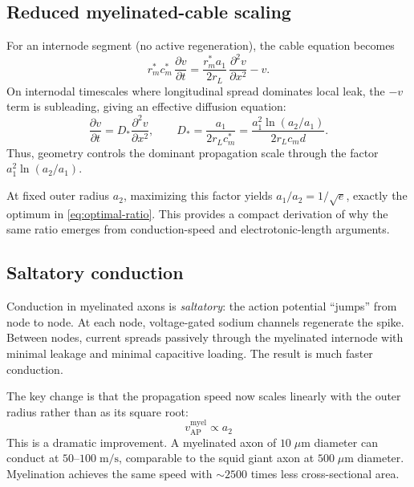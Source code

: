 \subsection{Reduced myelinated-cable scaling}

For an internode segment (no active regeneration), the cable equation becomes
%
\begin{equation}
  r_m^* c_m^*\,\frac{\partial v}{\partial t}
  =
  \frac{r_m^* a_1}{2r_L}\,\frac{\partial^2 v}{\partial x^2}
  - v.
  \label{eq:myelin-cable}
\end{equation}
%
On internodal timescales where longitudinal spread dominates local leak, the $-v$ term is subleading, giving an effective diffusion equation:
%
\begin{equation}
  \frac{\partial v}{\partial t} = D_* \frac{\partial^2 v}{\partial x^2},
  \qquad
  D_*=\frac{a_1}{2r_L c_m^*}
  =\frac{a_1^2\ln(a_2/a_1)}{2r_L c_m d}.
  \label{eq:myelin-diffusion}
\end{equation}
%
Thus, geometry controls the dominant propagation scale through the factor
$a_1^2\ln(a_2/a_1)$.

At fixed outer radius $a_2$, maximizing this factor yields
$a_1/a_2=1/\sqrt{e}$, exactly the optimum in \cref{eq:optimal-ratio}. This provides a compact derivation of why the same ratio emerges from conduction-speed and electrotonic-length arguments.

\subsection{Saltatory conduction}

Conduction in myelinated axons is \emph{saltatory}: the action potential ``jumps'' from node to node. At each node, voltage-gated sodium channels regenerate the spike. Between nodes, current spreads passively through the myelinated internode with minimal leakage and minimal capacitive loading. The result is much faster conduction.

The key change is that the propagation speed now scales linearly with the outer radius rather than as its square root:
%
\begin{equation}
  v_{\text{AP}}^{\text{myel}} \propto a_2
  \label{eq:myelin-speed}
\end{equation}
%
This is a dramatic improvement. A myelinated axon of $10\;\mu\text{m}$ diameter can conduct at $50$--$100\;\text{m/s}$, comparable to the squid giant axon at $500\;\mu\text{m}$ diameter. Myelination achieves the same speed with $\sim 2500$ times less cross-sectional area.

